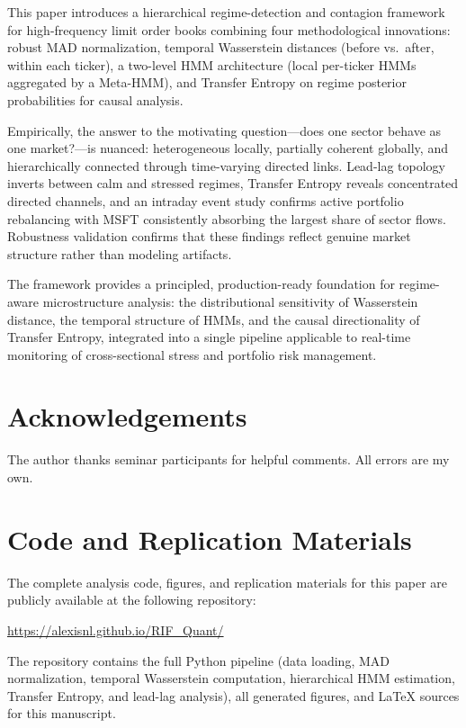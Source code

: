 \documentclass{article}
\begin{document}
This paper introduces a hierarchical regime-detection and contagion framework
for high-frequency limit order books combining four methodological innovations:
robust MAD normalization, temporal Wasserstein distances (before vs.\ after,
within each ticker), a two-level HMM architecture (local per-ticker HMMs
aggregated by a Meta-HMM), and Transfer Entropy on regime posterior
probabilities for causal analysis.

Empirically, the answer to the motivating question---does one sector behave as
one market?---is nuanced: heterogeneous locally, partially coherent globally,
and hierarchically connected through time-varying directed links. Lead-lag
topology inverts between calm and stressed regimes, Transfer Entropy reveals
concentrated directed channels, and an intraday event study confirms active
portfolio rebalancing with MSFT consistently absorbing the largest share of
sector flows. Robustness validation confirms that these findings reflect genuine
market structure rather than modeling artifacts.

The framework provides a principled, production-ready foundation for
regime-aware microstructure analysis: the distributional sensitivity of
Wasserstein distance, the temporal structure of HMMs, and the causal
directionality of Transfer Entropy, integrated into a single pipeline applicable
to real-time monitoring of cross-sectional stress and portfolio risk management.

\section*{Acknowledgements}

The author thanks seminar participants for helpful comments. All errors are
my own.

\section*{Code and Replication Materials}

The complete analysis code, figures, and replication materials for this paper
are publicly available at the following repository:
\begin{center}
\url{https://alexisnl.github.io/RIF_Quant/}
\end{center}
The repository contains the full Python pipeline (data loading, MAD
normalization, temporal Wasserstein computation, hierarchical HMM estimation,
Transfer Entropy, and lead-lag analysis), all generated figures, and
LaTeX sources for this manuscript.
\end{document}

